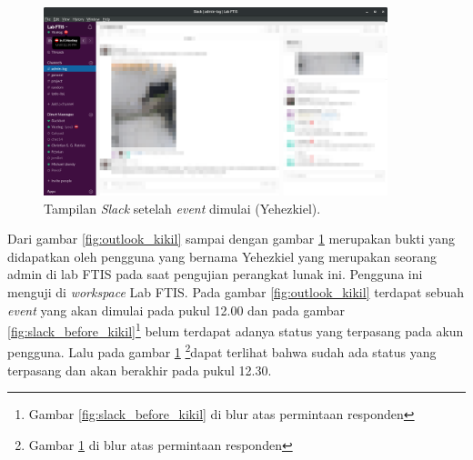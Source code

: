 \begin{figure}[h]
  \includegraphics[width=10cm]{./Gambar/PengujianKikil/Slack_After.png}
  \centering
  \caption{Tampilan \textit{Slack} setelah \textit{event} dimulai (Yehezkiel).}
  \label{fig:slack_after_kikil}
\end{figure}

Dari gambar \ref{fig:outlook_kikil} sampai dengan gambar \ref{fig:slack_after_kikil} merupakan bukti yang didapatkan oleh pengguna yang bernama Yehezkiel yang merupakan seorang admin di lab FTIS pada saat pengujian perangkat lunak ini. Pengguna ini menguji di \textit{workspace} Lab FTIS. Pada gambar \ref{fig:outlook_kikil} terdapat sebuah \textit{event} yang akan dimulai pada pukul 12.00 dan pada gambar \ref{fig:slack_before_kikil}\footnote{Gambar \ref{fig:slack_before_kikil} di blur atas permintaan responden} belum terdapat adanya status yang terpasang pada akun pengguna. Lalu pada gambar \ref{fig:slack_after_kikil} \footnote{Gambar \ref{fig:slack_after_kikil} di blur atas permintaan responden}dapat terlihat bahwa sudah ada status yang terpasang dan akan berakhir pada pukul 12.30. 

